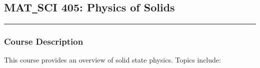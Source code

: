 	\subsection{MAT\texttt{\_}SCI 405: Physics of Solids}
	\vspace{-1em} \hfill \rule{0.4\textwidth}{.4pt}\newline
	\null \hfill {} \newline
	\null \hfill {}
\normalfont
		\subsubsection*{Course Description}
		This course provides an overview of solid state physics. Topics include:
		
